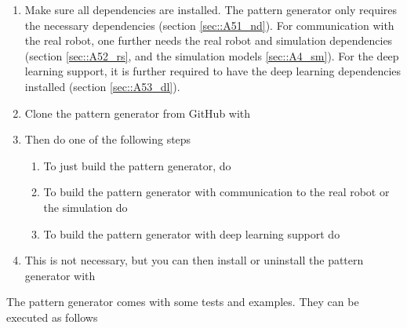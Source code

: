 \begin{enumerate}
	\item Make sure all dependencies are installed. The pattern generator only requires the necessary dependencies (section \ref{sec::A51_nd}). For communication with the real robot, one further needs the real robot and simulation dependencies (section \ref{sec::A52_rs}, and the simulation models \ref{sec::A4_sm}). For the deep learning support, it is further required to have the deep learning dependencies installed (section \ref{sec::A53_dl}).
	\item Clone the pattern generator from GitHub with
	\newline {}
	\item Then do one of the following steps
	\begin{enumerate}
		\item To just build the pattern generator, do
		\newline {}
		\newline {}
		\newline {}
		\item To build the pattern generator with communication to the real robot or the simulation do
		\newline {}
		\newline {}
		\newline {}
		\item To build the pattern generator with deep learning support do
		\newline {}
		\newline {} \newline  {}
		\newline {}
	\end{enumerate}
	\item This is not necessary, but you can then install or uninstall the pattern generator with
	\newline {}
	\newline {}
\end{enumerate}
The pattern generator comes with some tests and examples. They can be executed as follows
